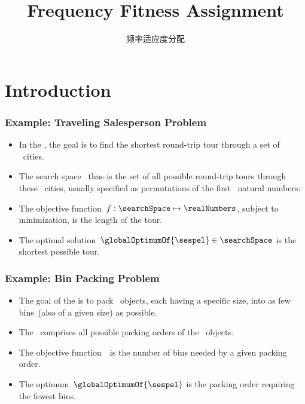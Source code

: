 \documentclass[aspectratio=169,mathserif,notheorems]{beamer}%
\title{Frequency Fitness Assignment}%
\subtitle{频率适应度分配}
\begin{document}
%
\startPresentation%
%
\section{Introduction}%
%
\xdef\sharedSlideTitle{Introduction to Optimization}%
%
%
%
%
\begin{frame}%
\frametitle{Example: Traveling Salesperson Problem}%
\parbox{0.373\paperwidth}{%
\begin{itemize}%
%
\item In the \cite{ABCC2006TTSPACS,LLRKS1985TTSPAGTOCO,GP2002TTSPAIV,WCLTTCMY2014BOAAOSFFTTSP,LWLvdBTW2024ATTSPWFFAAHA,WWCTL2016GVLSTIOPSOEAP}, the goal is to find the shortest round-trip tour through a set of \scale~cities.%
%
\item<2-> The search space \searchSpace\ thus is the set of all possible round-trip tours through these \scale~cities, usually specified as permutations of the first \scale~natural numbers.%
%
\item<3-> The objective function~$f:\searchSpace\mapsto\realNumbers$, subject to minimization, is the length of the tour.%
%
\item<4-> The optimal solution~$\globalOptimumOf{\sespel}\in\searchSpace$ is the shortest possible tour.%
%
\end{itemize}%
}%
%
%
%
%
\end{frame}%
%
\xdef\sharedSlideTitle{Example: Maximum Satisfiability Problem}%
%
%
\begin{frame}[t]%
\frametitle{Example: Bin Packing Problem}%
\begin{itemize}%
\item The goal of the  is to pack \scale~objects, each having a specific size, into as few bins~(also of a given size) as possible\cite{ZLWvdBTW2024RLSOT2RBPPWIR,ZWvdBTLTW2024RLSFTDBPAANRFFFA}.%
\item<2-> The \searchSpace\ comprises all possible packing orders of the \scale~objects.%
\item<3-> The objective function~\objFun\ is the number of bins needed by a given packing order.%
\item<4-> The optimum~$\globalOptimumOf{\sespel}$ is the packing order requiring the fewest bins.%
\end{itemize}%
%
\end{frame}%
\end{document}
